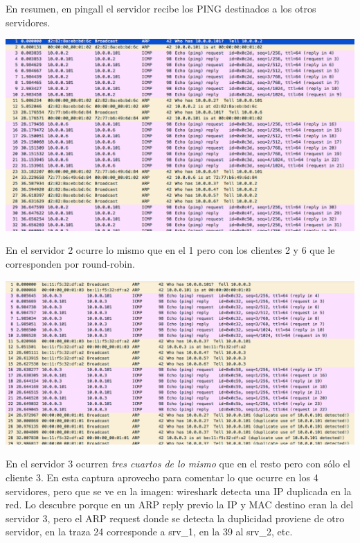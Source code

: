 \documentclass{article}
\begin{document}
En resumen, en pingall el servidor recibe los PING destinados a los otros servidores.

\hfill

\begin{center}
	\includegraphics[scale=0.5]{images/srv2.png}
\end{center}


En el servidor 2 ocurre lo mismo que en el 1 pero con los clientes 2 y 6 que le corresponden por round-robin.

\hfill

\begin{center}
	\includegraphics[scale=0.48]{images/srv3.png}
\end{center}

En el servidor 3 ocurren \textit{tres cuartos de lo mismo} que en el resto pero con sólo el cliente 3. En esta captura aprovecho para comentar lo que ocurre en los 4 servidores, pero que se ve en la imagen: wireshark detecta una IP duplicada en la red. Lo descubre porque en un ARP reply previo la IP y MAC destino eran la del servidor 3, pero el ARP request donde se detecta la duplicidad proviene de otro servidor, en la traza 24 corresponde a srv\_1, en la 39 al srv\_2, etc.
\end{document}
